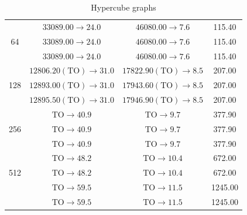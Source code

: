 \begin{table}[h!]
\begin{tabular}{c|c|c|c}
        \cmidrule(lr){1-4}

        \multirow{3}{*}{64}
            & $33089.00 \rightarrow 24.0$ & $46080.00 \rightarrow 7.6$ & 115.40 \\
            & $33089.00 \rightarrow 24.0$ & $46080.00 \rightarrow 7.6$ & 115.40 \\
            & $33089.00 \rightarrow 24.0$ & $46080.00 \rightarrow 7.6$ & 115.40 \\

        \cmidrule(lr){1-4}

        \multirow{3}{*}{128}
            & $12806.20(\mathrm{TO}) \rightarrow 31.0$ & $17822.90(\mathrm{TO}) \rightarrow 8.5$ & 207.00 \\
            & $12893.00(\mathrm{TO}) \rightarrow 31.0$ & $17943.60(\mathrm{TO}) \rightarrow 8.5$ & 207.00 \\
            & $12895.50(\mathrm{TO}) \rightarrow 31.0$ & $17946.90(\mathrm{TO}) \rightarrow 8.5$ & 207.00 \\

        \cmidrule(lr){1-4}

        \multirow{3}{*}{256}
            & $\mathrm{TO} \rightarrow 40.9$ & $\mathrm{TO} \rightarrow 9.7$ & 377.90 \\
            & $\mathrm{TO} \rightarrow 40.9$ & $\mathrm{TO} \rightarrow 9.7$ & 377.90 \\
            & $\mathrm{TO} \rightarrow 40.9$ & $\mathrm{TO} \rightarrow 9.7$ & 377.90 \\

        \cmidrule(lr){1-4}

        \multirow{3}{*}{512}
            & $\mathrm{TO} \rightarrow 48.2$ & $\mathrm{TO} \rightarrow 10.4$ & 672.00 \\
            & $\mathrm{TO} \rightarrow 48.2$ & $\mathrm{TO} \rightarrow 10.4$ & 672.00 \\

        \cmidrule(lr){1-4}

        \multirow{2}{*}{1024}
            & $\mathrm{TO} \rightarrow 59.5$ & $\mathrm{TO} \rightarrow 11.5$ & 1245.00 \\
            & $\mathrm{TO} \rightarrow 59.5$ & $\mathrm{TO} \rightarrow 11.5$ & 1245.00 \\

        \bottomrule
    \end{tabular}
    \caption*{Hypercube graphs}
\end{table}

